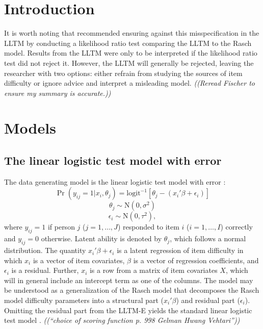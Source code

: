 \section{Introduction}

It is worth noting that \textcite{Fischer1973} recommended ensuring against this misspecification in the LLTM by conducting a likelihood ratio test comparing the LLTM to the Rasch model. Results from the LLTM were only to be interpreted if the likelihood ratio test did not reject it. However, the LLTM will generally be rejected, leaving the researcher with two options: either refrain from studying the sources of item difficulty or ignore advice and interpret a misleading model. 
\emph{((Reread Fischer to ensure my summary is accurate.))}


\section{Models}

\subsection{The linear logistic test model with error}

The data generating model is the linear logistic test model with error \parencite[LLTM-E;][]{DeBoeck2008}:
\begin{equation}
	\Pr(y_{ij} = 1 | x_i, \theta_j) =
	\mathrm{logit}^{-1} \left [ \theta_j - (x_i'\beta + \epsilon_i) \right ]
\end{equation}
\begin{equation}
	\theta_j \sim \mathrm{N}(0, \sigma^2)
\end{equation}
\begin{equation}
	\epsilon_i \sim \mathrm{N}(0, \tau^2)
,\end{equation}
where $y_{ij} = 1$ if person $j$ ($j = 1, \dotsc, J$) responded to item $i$ ($i = 1, \dotsc, I$) correctly and $y_{ij} = 0$ otherwise. 
Latent ability is denoted by $\theta_j$, which follows a normal distribution. 
The quantity $x_i'\beta + \epsilon_i$ is a latent regression of item difficulty in which $x_i$ is a vector of item covariates, $\beta$ is a vector of regression coefficients, and $\epsilon_i$ is a residual. 
Further, $x_i$ is a row from a matrix of item covariates $X$, which will in general include an intercept term as one of the columns.
The model may be understood as a generalization of the Rasch model \parencite{Rasch1960a} that decomposes the Rasch model difficulty parameters into a structural part ($x_i'\beta$) and residual part ($\epsilon_i$).
Omitting the residual part from the LLTM-E yields the standard linear logistic test model \parencite[LLTM;][]{Fischer1973}.
\emph{((``choice of scoring function p. 998 Gelman Hwang Vehtari''))}


